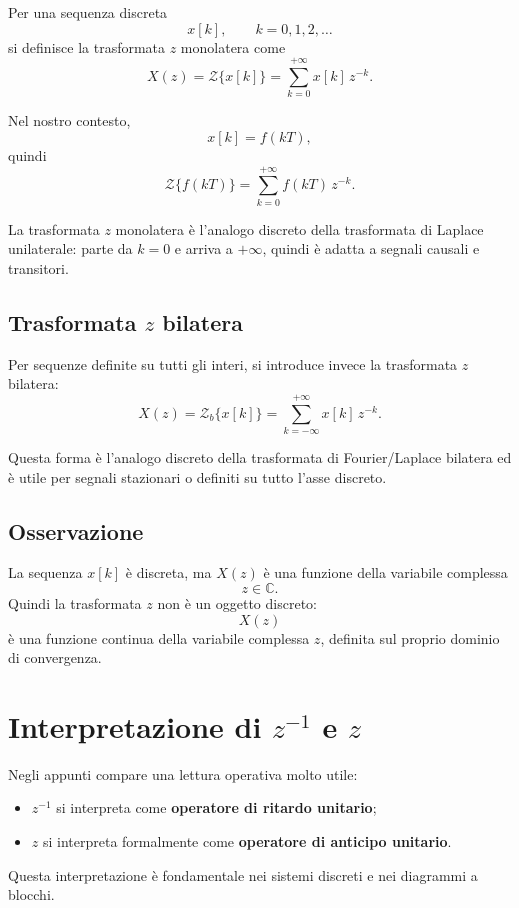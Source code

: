 Per una sequenza discreta
\[
x[k], \qquad k=0,1,2,\dots
\]
si definisce la trasformata \(z\) monolatera come
\[
X(z)=\mathcal{Z}\{x[k]\}=\sum_{k=0}^{+\infty} x[k]\,z^{-k}.
\]

Nel nostro contesto,
\[
x[k]=f(kT),
\]
quindi
\[
\mathcal{Z}\{f(kT)\}=\sum_{k=0}^{+\infty} f(kT)\,z^{-k}.
\]

La trasformata \(z\) monolatera è l'analogo discreto della trasformata di Laplace unilaterale:
parte da \(k=0\) e arriva a \(+\infty\), quindi è adatta a segnali causali e transitori.

\subsection{Trasformata \(z\) bilatera}

Per sequenze definite su tutti gli interi, si introduce invece la trasformata \(z\) bilatera:
\[
X(z)=\mathcal{Z}_b\{x[k]\}=\sum_{k=-\infty}^{+\infty} x[k]\,z^{-k}.
\]

Questa forma è l'analogo discreto della trasformata di Fourier/Laplace bilatera
ed è utile per segnali stazionari o definiti su tutto l'asse discreto.

\subsection{Osservazione}

La sequenza \(x[k]\) è discreta, ma \(X(z)\) è una funzione della variabile complessa
\[
z\in\mathbb{C}.
\]
Quindi la trasformata \(z\) non è un oggetto discreto:
\[
X(z)
\]
è una funzione continua della variabile complessa \(z\), definita sul proprio dominio di convergenza.

\section{Interpretazione di \(z^{-1}\) e \(z\)}

Negli appunti compare una lettura operativa molto utile:
\begin{itemize}
    \item \(z^{-1}\) si interpreta come \textbf{operatore di ritardo unitario};
    \item \(z\) si interpreta formalmente come \textbf{operatore di anticipo unitario}.
\end{itemize}

Questa interpretazione è fondamentale nei sistemi discreti e nei diagrammi a blocchi.

